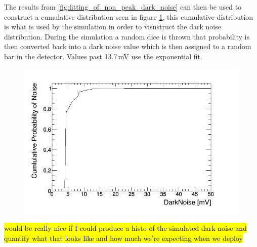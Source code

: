 The results from \ref{fig:fitting_of_non_peak_dark_noise} can then be used to construct a cumulative distribution seen in figure \ref{fig:cumulative_prob_dark}, this cumulative distribution is what is used by the simulation in order to visnstruct the dark noise distribution. During the simulation a random dice is thrown that probability is then converted back into a dark noise value which is then assigned to a random bar in the detector. Values past 13.7\,mV use the exponential fit.
\begin{figure}[H]
 \centering
 \includegraphics[width=0.8\linewidth]{cumulative_prob_dark_noise.png}
 \label{fig:cumulative_prob_dark}
\end{figure}
\hl{would be really nice if I could produce a histo of the simulated dark noise and quantify what that looks like and how much we're expecting when we deploy}

